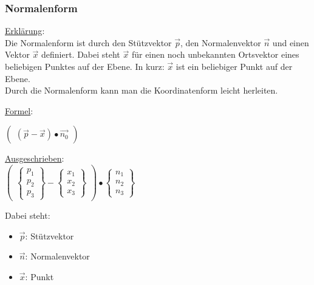 
\subsubsection{Normalenform}
\underline{Erklärung}: \\
Die Normalenform ist durch den Stützvektor $\vec{p}$, 
den Normalenvektor $\vec{n}$ und einen Vektor $\vec{x}$ definiert.
Dabei steht $\vec{x}$ für einen noch unbekannten Ortsvektor eines beliebigen Punktes auf der Ebene. 
In kurz: $\vec{x}$ ist ein beliebiger Punkt auf der Ebene. \\
Durch die Normalenform kann man die Koordinatenform leicht herleiten.
\par
\underline{Formel}: 
\par
$
\begin{pmatrix}
    (\vec{p} - \vec{x}) \bullet \vec{n_0}
\end{pmatrix}
$ 
\par
\underline{Ausgeschrieben}: \\
$
\begin{pmatrix}
    \begin{Bmatrix}
        p_1 \\ p_2 \\ p_3
    \end{Bmatrix} 
    - 
    \begin{Bmatrix}
        x_1 \\ x_2 \\ x_3
    \end{Bmatrix}
\end{pmatrix}
\bullet 
\begin{Bmatrix}
    n_1 \\ n_2 \\ n_3
\end{Bmatrix}
$
\par
Dabei steht: 
\begin{itemize}
    \item $\vec{p}$: Stützvektor
    \item $\vec{n}$: Normalenvektor
    \item $\vec{x}$: Punkt
\end{itemize}

